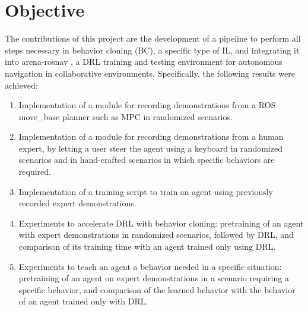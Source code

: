 \section{Objective}
The contributions of this project are the development of a pipeline to perform all steps necessary in behavior cloning (BC), a specific type of IL, and integrating it into arena-rosnav \citep{rosnav}, a DRL training and testing environment for autonomous navigation in collaborative environments. Specifically, the following results were achieved:
\begin{enumerate}
\item Implementation of a module for recording demonstrations from a ROS move\_base planner such as MPC in randomized scenarios.
\item Implementation of a module for recording demonstrations from a human expert, by letting a user steer the agent using a keyboard in randomized scenarios and in hand-crafted scenarios in which specific behaviors are required.
\item Implementation of a training script to train an agent using previously recorded expert demonstrations.
\item Experiments to accelerate DRL with behavior cloning: pretraining of an agent with expert demonstrations in randomized scenarios, followed by DRL, and comparison of its training time with an agent trained only using DRL.
\item Experiments to teach an agent a behavior needed in a specific situation: pretraining of an agent on expert demonstrations in a scenario requiring a specific behavior, and comparison of the learned behavior with the behavior of an agent trained only with DRL.
\end{enumerate}
